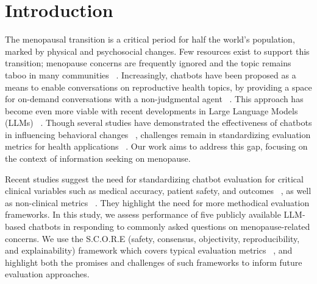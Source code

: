 \section{Introduction}

The menopausal transition is a critical period for half the world’s population, marked by physical and psychosocial changes. Few resources exist to support this transition; menopause concerns are frequently ignored and the topic remains taboo in many communities ~\cite{kaunitz2015management}.
Increasingly, chatbots have been proposed as a means to enable conversations on reproductive health topics, by providing a space for on-demand conversations with a non-judgmental agent ~\cite{mills2023chatbots}. This approach has become even more viable with recent developments in Large Language Models (LLMs) ~\cite{park2024assessing}. Though several studies have demonstrated the effectiveness of chatbots in influencing behavioral changes ~\cite{pereira2019using}, challenges remain in standardizing evaluation metrics for health applications ~\cite{guo2020challenges}. Our work aims to address this gap, focusing on the context of information seeking on menopause.

Recent studies suggest the need for standardizing chatbot evaluation for critical clinical variables such as medical accuracy, patient safety, and outcomes ~\cite{beavers2023evaluation}, as well as non-clinical metrics ~\cite{abd2020technical}. They highlight the need for more methodical evaluation frameworks.
In this study, we assess performance of five publicly available LLM-based chatbots in responding to commonly asked questions on menopause-related concerns. 
We use the S.C.O.R.E (safety, consensus, objectivity, reproducibility, and explainability) framework which covers typical evaluation metrics ~\cite{tan2024proposed}, and highlight both the promises and challenges of such frameworks to inform future evaluation approaches.